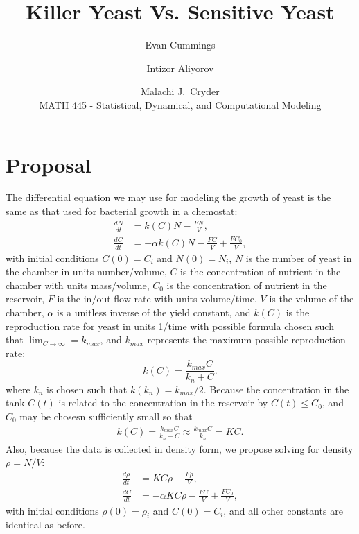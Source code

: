 


\small

\title{Killer Yeast Vs. Sensitive Yeast}
\author{Evan Cummings \and Intizor Aliyorov \and Malachi J.\ Cryder\\
MATH 445 - Statistical, Dynamical, and Computational Modeling}

\maketitle

\section*{Proposal}
The differential equation we may use for modeling the growth of yeast is the same as that used for bacterial growth in a chemostat:
\begin{align*}
  \frac{dN}{dt} &= k(C) N - \frac{FN}{V}, \\
  \frac{dC}{dt} &= -\alpha k(C) N - \frac{FC}{V} + \frac{FC_0}{V},
\end{align*}
with initial conditions $C(0) = C_i$ and $N(0) = N_i$, $N$ is the number of yeast in the chamber in units number/volume, $C$ is the concentration of nutrient in the chamber with units mass/volume, $C_0$ is the concentration of nutrient in the reservoir, $F$ is the in/out flow rate with units volume/time, $V$ is the volume of the chamber, $\alpha$ is a unitless inverse of the yield constant, and $k(C)$ is the reproduction rate for yeast in units 1/time with possible formula chosen such that $\lim_{C \rightarrow \infty} = k_{max}$, and $k_{max}$ represents the maximum possible reproduction rate:
$$k(C) = \frac{k_{max} C}{k_n + C}.$$
where $k_n$ is chosen such that $k(k_n) = k_{max} / 2$.  Because the concentration in the tank $C(t)$ is related to the concentration in the reservoir by $C(t) \leq C_0$, and $C_0$ may be chosesn sufficiently small so that 
\begin{align*}
  k(C) = \frac{k_{max} C}{k_n + C} \approx \frac{k_{max} C}{k_n} = KC.
\end{align*}
Also, because the data is collected in density form, we propose solving for density $\rho = N/V$:
\begin{align}
  \frac{d\rho}{dt} &= KC \rho - \frac{F\rho}{V}, \\
  \frac{dC}{dt} &= -\alpha KC \rho - \frac{FC}{V} + \frac{FC_0}{V},
\end{align}
with initial conditions $\rho(0) = \rho_i$ and $C(0) = C_i$, and all other constants are identical as before.

